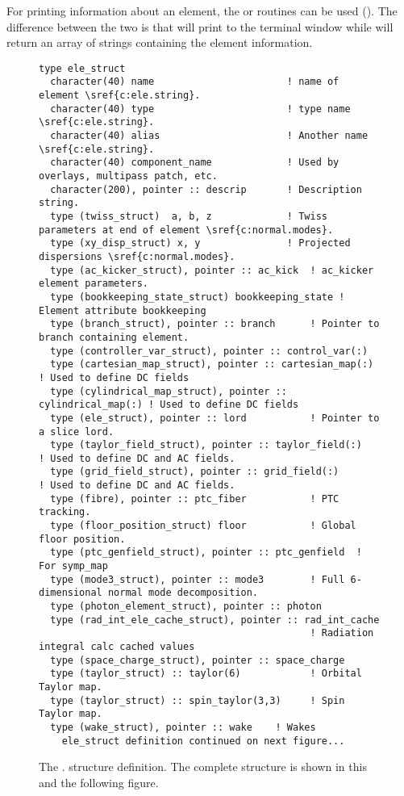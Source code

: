 For printing information about an element, the
 or  routines
can be used (). The difference between the two is
that  will print to the terminal window while 
will return an array of strings containing the element information.
\nopagebreak[4]
\begin{figure}[htb]
\centering
\footnotesize
\begin{verbatim}
type ele_struct
  character(40) name                       ! name of element \sref{c:ele.string}.
  character(40) type                       ! type name \sref{c:ele.string}.
  character(40) alias                      ! Another name \sref{c:ele.string}.
  character(40) component_name             ! Used by overlays, multipass patch, etc.
  character(200), pointer :: descrip       ! Description string.
  type (twiss_struct)  a, b, z             ! Twiss parameters at end of element \sref{c:normal.modes}.
  type (xy_disp_struct) x, y               ! Projected dispersions \sref{c:normal.modes}.
  type (ac_kicker_struct), pointer :: ac_kick  ! ac_kicker element parameters.
  type (bookkeeping_state_struct) bookkeeping_state ! Element attribute bookkeeping
  type (branch_struct), pointer :: branch      ! Pointer to branch containing element.
  type (controller_var_struct), pointer :: control_var(:) 
  type (cartesian_map_struct), pointer :: cartesian_map(:)     ! Used to define DC fields
  type (cylindrical_map_struct), pointer :: cylindrical_map(:) ! Used to define DC fields
  type (ele_struct), pointer :: lord           ! Pointer to a slice lord.
  type (taylor_field_struct), pointer :: taylor_field(:)       ! Used to define DC and AC fields.
  type (grid_field_struct), pointer :: grid_field(:)           ! Used to define DC and AC fields.
  type (fibre), pointer :: ptc_fiber           ! PTC tracking.
  type (floor_position_struct) floor           ! Global floor position.
  type (ptc_genfield_struct), pointer :: ptc_genfield  ! For symp_map
  type (mode3_struct), pointer :: mode3        ! Full 6-dimensional normal mode decomposition.
  type (photon_element_struct), pointer :: photon
  type (rad_int_ele_cache_struct), pointer :: rad_int_cache  
                                               ! Radiation integral calc cached values 
  type (space_charge_struct), pointer :: space_charge 
  type (taylor_struct) :: taylor(6)            ! Orbital Taylor map.
  type (taylor_struct) :: spin_taylor(3,3)     ! Spin Taylor map.
  type (wake_struct), pointer :: wake    ! Wakes
    ele_struct definition continued on next figure...
\end{verbatim}
\caption[The  (part 1).]{The . structure definition. 
The complete structure is shown in this and the following figure.}
\label{f:ele.struct1}
\end{figure}

